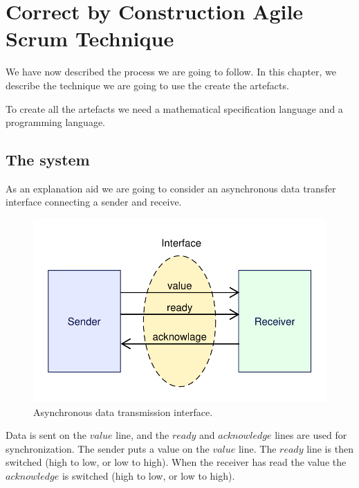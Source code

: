
\chapter{Correct by Construction Agile Scrum Technique} %

\label{Chapter_Applying_the_methodology} %

We have now described the process we are going to follow. In this chapter, we describe 
the technique we are going to use the create the artefacts.

To create all the artefacts we need a mathematical specification language and a 
programming language.

\section{The system}
As an explanation aid we are going to consider an asynchronous data transfer
interface connecting a sender and receive.

\begin{figure}[H]
	\centering
	\includegraphics[scale=0.75]{Figures/AsyncInterface.pdf}
	\decoRule
	\caption{Asynchronous data transmission interface.}
	\label{fig:AsyncInterface}
\end{figure}

Data is sent on the \(value\) line, and the \(ready\) and \(acknowledge\) lines are
used for synchronization. The sender puts a value on the \(value\) line. The 
\(ready\) line is then switched (high to low, or low to high). When the receiver has
read the value the \(acknowledge\) is switched (high to low, or low to high).

